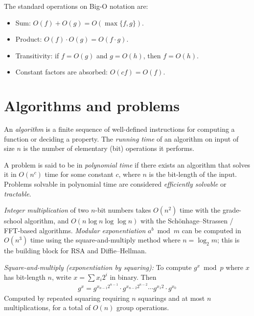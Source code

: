 \documentclass[a4paper, 12pt]{book} %
\begin{document}
\begin{proposition}
    The standard operations on Big-O notation are:
    \begin{itemize}
        \item Sum: $O(f) + O(g) = O(\max\{f, g\})$.
        \item Product: $O(f) \cdot O(g) = O(f \cdot g)$.
        \item Transitivity: if $f = O(g)$ and $g = O(h)$, then $f = O(h)$.
        \item Constant factors are absorbed: $O(c f) = O(f)$.
    \end{itemize}
\end{proposition}

\section{Algorithms and problems}

\begin{definition}
    An \emph{algorithm} is a finite sequence of well-defined instructions for computing a function or deciding a property. The \emph{running time} of an algorithm on input of size $n$ is the number of elementary (bit) operations it performs.
\end{definition}

\begin{definition}
    A problem is said to be in \emph{polynomial time} if there exists an algorithm that solves it in $O(n^c)$ time for some constant $c$, where $n$ is the bit-length of the input. Problems solvable in polynomial time are considered \emph{efficiently solvable} or \emph{tractable}.
\end{definition}

\begin{example}
    \emph{Integer multiplication} of two $n$-bit numbers takes $O(n^2)$ time with the grade-school algorithm, and $O(n \log n \log\log n)$ with the Schönhage--Strassen / FFT-based algorithms. \emph{Modular exponentiation} $a^b \bmod m$ can be computed in $O(n^3)$ time using the square-and-multiply method where $n = \log_2 m$; this is the building block for RSA and Diffie--Hellman.
\end{example}

\begin{proposition}
    \emph{Square-and-multiply (exponentiation by squaring):} To compute $g^x \bmod p$ where $x$ has bit-length $n$, write $x = \sum x_i 2^i$ in binary. Then
    \begin{align}
        g^x = g^{x_{n-1} 2^{n-1}} \cdot g^{x_{n-2} 2^{n-2}} \cdots g^{x_1 2} \cdot g^{x_0}
    \end{align}
    Computed by repeated squaring requiring $n$ squarings and at most $n$ multiplications, for a total of $O(n)$ group operations.
\end{proposition}
\end{document}
